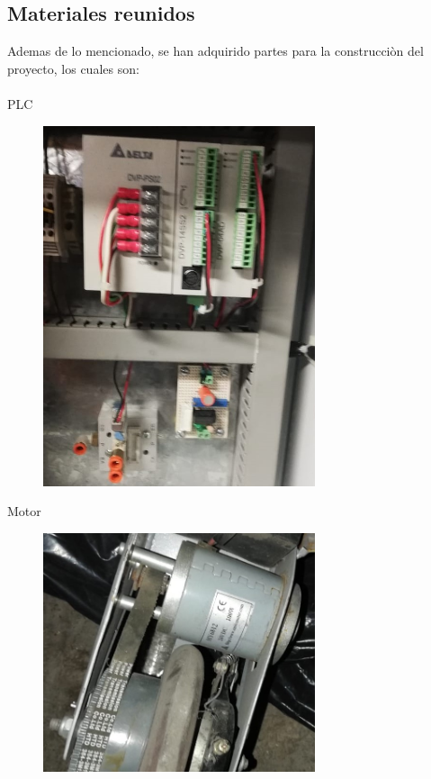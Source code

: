 \documentclass[12pt,a4paper]{report}
\begin{document}
\subsection{Materiales reunidos}
Ademas de lo mencionado, se han adquirido partes para la construcciòn del proyecto, los cuales son:\\
\\

PLC
\begin{figure}[h!]
\centering
\includegraphics[width=8cm]{PLC.jpg} 
\end{figure}
\newpage

Motor
\begin{figure}[h!]
\centering
\includegraphics[width=8cm]{Motor.jpg} 
\end{figure}

\cite{manjarr2010}


\end{document}
